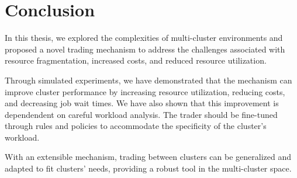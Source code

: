 
\chapter{Conclusion}

In this thesis, we explored the complexities of multi-cluster environments and
proposed a novel trading mechanism to address the challenges associated with
resource fragmentation, increased costs, and reduced resource utilization. 

Through simulated experiments, we have demonstrated that the mechanism can
improve cluster performance by increasing resource utilization, reducing costs,
and decreasing job wait times. We have also shown that this improvement is
dependendent on careful workload analysis. The trader should be fine-tuned
through rules and policies to accommodate the specificity of the cluster's
workload. 

With an extensible mechanism, trading between clusters can be generalized and
adapted to fit clusters' needs, providing a robust tool in the multi-cluster
space. 

